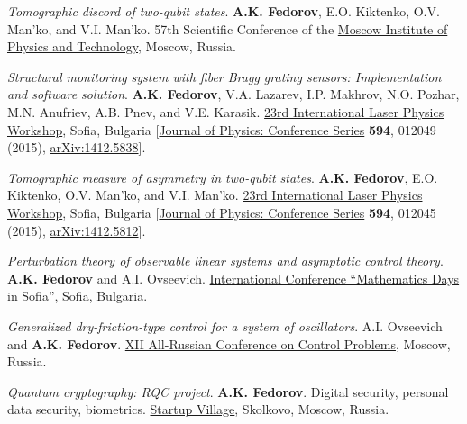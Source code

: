 \documentclass[10pt,a4paper,sans]{moderncv}
\begin{document}
	{\textit{Tomographic discord of two-qubit states}.
	\textbf{A.K. Fedorov}, E.O. Kiktenko, O.V. Man'ko, and V.I. Man'ko.
	57th Scientific Conference of the \textcolor{blue}{\href{http://mipt.ru/en/}{Moscow Institute of Physics and Technology}}, 
	Moscow, Russia.}

	{\textit{Structural monitoring system with fiber Bragg grating sensors: Implementation and software solution}.
	\textbf{A.K. Fedorov}, V.A. Lazarev, I.P. Makhrov, N.O. Pozhar, M.N. Anufriev, A.B. Pnev, and V.E. Karasik.
	\textcolor{blue}{\href{http://www.lasphys.com/workshops/lasphys14/}{23rd International Laser Physics Workshop}},
	Sofia, Bulgaria 
	[\textcolor{blue}{\href{http://dx.doi.org/10.1088/1742-6596/594/1/012049}{Journal of Physics: Conference Series}} \textbf{594}, 012049 (2015), 
	{\textcolor{blue}{\href{http://arxiv.org/abs/1412.5838}{arXiv:1412.5838}}}].}
	
	{\textit{Tomographic measure of asymmetry in two-qubit states}.
	\textbf{A.K. Fedorov}, E.O. Kiktenko, O.V. Man'ko, and V.I. Man'ko.
	\textcolor{blue}{\href{http://www.lasphys.com/workshops/lasphys14/}{23rd International Laser Physics Workshop}},
	Sofia, Bulgaria
	[\textcolor{blue}{\href{http://dx.doi.org/10.1088/1742-6596/594/1/012045}{Journal of Physics: Conference Series}} \textbf{594}, 012045 (2015), 
	{\textcolor{blue}{\href{http://arxiv.org/abs/1412.5812}{arXiv:1412.5812}}}].}

	{\textit{Perturbation theory of observable linear systems and asymptotic control theory}.
	\textbf{A.K. Fedorov} and A.I. Ovseevich.
	\textcolor{blue}{\href{http://www.math.bas.bg/mds2014/}{International Conference ``Mathematics Days in Sofia''}},
	Sofia, Bulgaria.}	

	{\textit{Generalized dry-friction-type control for a system of oscillators}.
	A.I. Ovseevich and \textbf{A.K. Fedorov}.
	\textcolor{blue}{\href{http://vspu2014.ipu.ru}{XII All-Russian Conference on Control Problems}},
	Moscow, Russia.}	

	{\textit{Quantum cryptography: RQC project}.
	\textbf{A.K. Fedorov}. Digital security, personal data security, biometrics.
	\textcolor{blue}{\href{http://www.startupvillage.ru}{Startup Village}},
	Skolkovo, Moscow, Russia.}	
\end{document}
